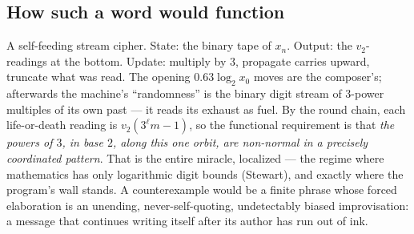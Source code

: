 \documentclass[10pt]{article}
\begin{document}
\subsection*{How such a word would function}
A self-feeding stream cipher. State: the binary tape of $x_n$.
Output: the $v_2$-readings at the bottom. Update: multiply by $3$,
propagate carries upward, truncate what was read. The opening
$0.63\log_2x_0$ moves are the composer's; afterwards the machine's
``randomness'' is the binary digit stream of $3$-power multiples of
its own past --- it reads its exhaust as fuel. By the round chain,
each life-or-death reading is $v_2(3^\ell m-1)$, so the functional
requirement is that \emph{the powers of $3$, in base $2$, along this
one orbit, are non-normal in a precisely coordinated pattern}. That is
the entire miracle, localized --- the regime where mathematics has
only logarithmic digit bounds (Stewart), and exactly where the
program's wall stands. A counterexample would be a finite phrase whose
forced elaboration is an unending, never-self-quoting, undetectably
biased improvisation: a message that continues writing itself after
its author has run out of ink.
\end{document}
